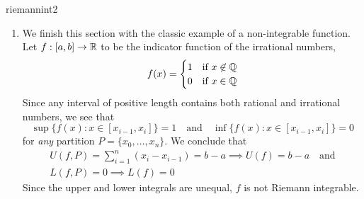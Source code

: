 \begin{examples}{}{riemannint2}
\begin{enumerate}
	\item We finish this section with the classic example of a non-integrable function. Let $f:[a,b]\to\mathbb{R}$ to be the indicator function of the irrational numbers,
	\[f(x)=\begin{cases}
	1&\text{if }x\not\in\mathbb{Q}\\
	0&\text{if }x\in\mathbb{Q}
	\end{cases}\]
	Since any interval of positive length contains both rational and irrational numbers, we see that
	\[\sup\bigl\{f(x):x\in[x_{i-1},x_i]\bigr\}=1\quad\text{and}\quad \inf\bigl\{f(x):x\in[x_{i-1},x_i]\bigr\}=0\]
	for \emph{any} partition $P=\{x_0,\ldots,x_n\}$. We conclude that
	\begin{gather*}
	U(f,P)=\sum_{i=1}^n(x_i-x_{i-1})=b-a\implies U(f)=b-a\quad\text{and}\\
	L(f,P)=0\implies L(f)=0
	\end{gather*}
	Since the upper and lower integrals are unequal, $f$ is not Riemann integrable.
\end{enumerate}
\end{examples}



